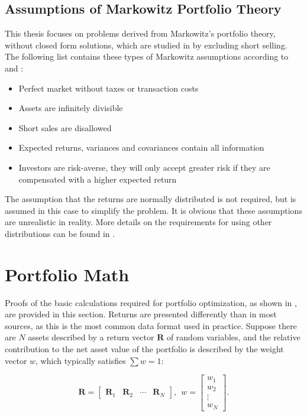 \documentclass[
  oneside, a4paper, 12pt, openany]{book}
\providecommand{\tightlist}{%
  \setlength{\itemsep}{0pt}\setlength{\parskip}{0pt}}
\theoremstyle{definition}
\theoremstyle{definition}
\theoremstyle{definition}
\theoremstyle{definition}
\theoremstyle{remark}
\begin{document}
\hypertarget{assumptions-of-markowitz-portfolio-theory}{%
\subsection{Assumptions of Markowitz Portfolio Theory}\label{assumptions-of-markowitz-portfolio-theory}}

This thesis focuses on problems derived from Markowitz's portfolio theory, without closed form solutions, which are studied in \citep{Mari2005} by excluding short selling. The following list contains these types of Markowitz assumptions according to \citep{Mari2005} and \citep{Mark1952}:

\begin{itemize}
\tightlist
\item
  Perfect market without taxes or transaction costs
\item
  Assets are infinitely divisible
\item
  Short sales are disallowed
\item
  Expected returns, variances and covariances contain all information
\item
  Investors are risk-averse, they will only accept greater risk if they
  are compensated with a higher expected return
\end{itemize}

The assumption that the returns are normally distributed is not required, but is assumed in this case to simplify the problem. It is obvious that these assumptions are unrealistic in reality. More details on the requirements for using other distributions can be found in \citep{Mari2005}.

\hypertarget{portfolio-math}{%
\section{Portfolio Math}\label{portfolio-math}}

Proofs of the basic calculations required for portfolio optimization, as shown in \citep{Eric2021}, are provided in this section. Returns are presented differently than in most sources, as this is the most common data format used in practice. Suppose there are \(N\) assets described by a return vector \(\pmb{R}\) of random variables, and the relative contribution to the net asset value of the portfolio is described by the weight vector \(w\), which typically satisfies \(\sum w = 1\):

\[
  \pmb{R} = 
  \begin{bmatrix}
    \pmb{R}_{1} & \pmb{R}_{2} & \cdots & \pmb{R}_{N}  
 \end{bmatrix}
 , \ \ 
 w = 
  \begin{bmatrix}
    w_{1} \\ 
    w_{2} \\
    \vdots \\
    w_{N}  
 \end{bmatrix}.
\]
\end{document}
